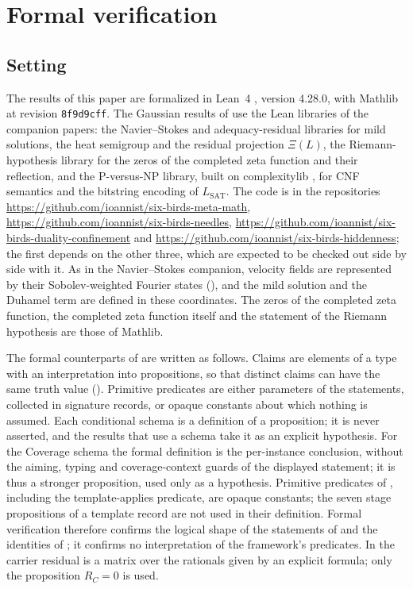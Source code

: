 \section{Formal verification}\label{app:formalization}

\subsection{Setting}\label{app:formalization:setting}

The results of this paper are formalized in Lean~4
\cite{deMouraUllrich2021Lean4}, version 4.28.0, with Mathlib
\cite{MathlibCommunity2020Lean} at revision \texttt{8f9d9cff}.  The
Gaussian results of  use the
Lean libraries of the companion papers: the Navier--Stokes and
adequacy-residual libraries for mild solutions, the heat semigroup and
the residual projection \(\Xi(L)\), the Riemann-hypothesis library for
the zeros of the completed zeta function and their reflection, and the
P-versus-NP library, built on complexitylib \cite{Schlesinger2026Complexitylib},
for CNF semantics and the bitstring encoding of \(L_{\mathrm{SAT}}\).
The code is in the repositories
\url{https://github.com/ioannist/six-birds-meta-math},
\url{https://github.com/ioannist/six-birds-needles},
\url{https://github.com/ioannist/six-birds-duality-confinement} and
\url{https://github.com/ioannist/six-birds-hiddenness}; the first
depends on the other three, which are expected to be checked out side
by side with it.  As in the Navier--Stokes companion,
velocity fields are represented by their Sobolev-weighted Fourier
states (), and the mild solution and the
Duhamel term are defined in these coordinates.  The zeros of the
completed zeta function, the completed zeta function itself and the
statement of the Riemann hypothesis are those of Mathlib.

The formal counterparts of  are
written as follows.  Claims are elements of a type with an
interpretation into propositions, so that distinct claims can have the
same truth value ().  Primitive
predicates are either parameters of the statements, collected in
signature records, or opaque constants about which nothing is assumed.
Each conditional schema is a definition of a proposition; it is never
asserted, and the results that use a schema take it as an explicit
hypothesis.  For the Coverage schema the formal definition is the
per-instance conclusion, without the aiming, typing and coverage-context
guards of the displayed statement; it is thus a stronger proposition,
used only as a hypothesis.  Primitive
predicates of , including the template-applies
predicate, are opaque constants; the seven stage propositions of a
template record are not used in their definition.  Formal verification
therefore confirms the logical shape of the statements of
 and the
identities of ; it confirms
no interpretation of the framework's predicates.  In  the carrier residual is a matrix
over the rationals given by an explicit formula; only the proposition
\(R_{C}=0\) is used.

